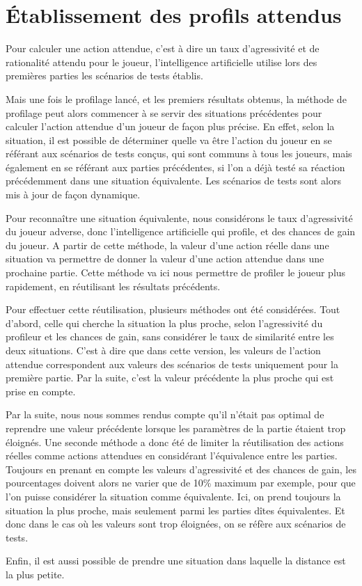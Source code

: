 \documentclass{report}
\begin{document}
\section{Établissement des profils attendus}

\hspace{0.5cm}Pour calculer une action attendue, c'est à dire un taux d'agressivité et de rationalité attendu pour le joueur, l'intelligence artificielle utilise lors des premières parties les scénarios de tests établis.\par
Mais une fois le profilage lancé, et les premiers résultats obtenus, la méthode de profilage peut alors commencer à se servir des situations précédentes pour calculer l'action attendue d'un joueur de façon plus précise. En effet, selon la situation, il est possible de déterminer quelle va être l'action du joueur en se référant aux scénarios de tests conçus, qui sont communs à tous les joueurs, mais également en se référant aux parties précédentes, si l'on a déjà testé sa réaction précédemment dans une situation équivalente. Les scénarios de tests sont alors mis à jour de façon dynamique.\par 

Pour reconnaître une situation équivalente, nous considérons le taux d'agressivité du joueur adverse, donc l'intelligence artificielle qui profile, et des chances de gain du joueur. A partir de cette méthode, la valeur d'une action réelle dans une situation va permettre de donner la valeur d'une action attendue dans une prochaine partie. Cette méthode va ici nous permettre de profiler le joueur plus rapidement, en réutilisant les résultats précédents.\par

Pour effectuer cette réutilisation, plusieurs méthodes ont été considérées. Tout d'abord, celle qui cherche la situation la plus proche, selon l'agressivité du profileur et les chances de gain, sans considérer le taux de similarité entre les deux situations. C'est à dire que dans cette version, les valeurs de l'action attendue correspondent aux valeurs des scénarios de tests uniquement pour la première partie. Par la suite, c'est la valeur précédente la plus proche qui est prise en compte.\par

Par la suite, nous nous sommes rendus compte qu'il n'était pas optimal de reprendre une valeur précédente lorsque les paramètres de la partie étaient trop éloignés. Une seconde méthode a donc été de limiter la réutilisation des actions réelles comme actions attendues en considérant l'équivalence entre les parties. Toujours en prenant en compte les valeurs d'agressivité et des chances de gain, les pourcentages doivent alors ne varier que de 10\% maximum par exemple, pour que l'on puisse considérer la situation comme équivalente. Ici, on prend toujours la situation la plus proche, mais seulement parmi les parties dîtes équivalentes. Et donc dans le cas où les valeurs sont trop éloignées, on se réfère aux scénarios de tests.\par
Enfin, il est aussi possible de prendre une situation dans laquelle la distance est la plus petite.
\end{document}
